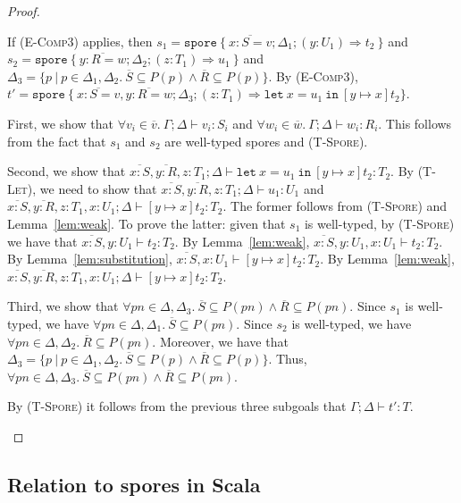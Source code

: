 \documentclass[a4paper,twoside]{article}
\newcommand{\seq}[1]{\overline{#1}}
\begin{document}
\begin{proof}
\begin{itemize}
If (\textsc{E-Comp3}) applies, then $s_1 = \texttt{spore}~\{~\seq{x:S=v}; \Delta_1; (y: U_1) \Rightarrow t_2~\}$ and $s_2 = \texttt{spore}~\{~\seq{y:R=w}; \Delta_2; (z: T_1) \Rightarrow u_1~\}$ and $\Delta_3 = \{ p~|~p \in \Delta_1,\Delta_2.~\seq{S} \subseteq P(p) \land \seq{R} \subseteq P(p)\}$. By (\textsc{E-Comp3}), \\ $t' = \texttt{spore}~\{~\seq{x:S=v}, \seq{y:R=w} ; \Delta_3 ; (z: T_1) \Rightarrow \texttt{let}~x = u_1~\texttt{in}~[y \mapsto x]t_2\}$.

First, we show that $\forall v_i \in \seq{v}.~\Gamma ; \Delta \vdash v_i : S_i$ and $\forall w_i \in \seq{w}.~\Gamma ; \Delta \vdash w_i : R_i$. This follows from the fact that $s_1$ and $s_2$ are well-typed spores and (\textsc{T-Spore}).

Second, we show that $\seq{x:S}, \seq{y:R}, z:T_1 ; \Delta \vdash \texttt{let}~x = u_1~\texttt{in}~[y \mapsto x]t_2 : T_2$. By (\textsc{T-Let}), we need to show that $\seq{x:S}, \seq{y:R}, z:T_1 ; \Delta \vdash u_1 : U_1$ and $\seq{x:S}, \seq{y:R}, z:T_1, x:U_1 ; \Delta \vdash [y \mapsto x]t_2 : T_2$. The former follows from (\textsc{T-Spore}) and Lemma~\ref{lem:weak}. To prove the latter: given that $s_1$ is well-typed, by (\textsc{T-Spore}) we have that $\seq{x:S}, y:U_1 \vdash t_2 : T_2$. By Lemma~\ref{lem:weak}, $\seq{x:S}, y:U_1, x:U_1 \vdash t_2 : T_2$. By Lemma~\ref{lem:substitution}, $\seq{x:S}, x:U_1 \vdash [y \mapsto x]t_2 : T_2$. By Lemma~\ref{lem:weak}, $\seq{x:S}, \seq{y:R}, z:T_1, x:U_1 ; \Delta \vdash [y \mapsto x]t_2 : T_2$.

Third, we show that $\forall pn \in \Delta, \Delta_3.~\seq{S} \subseteq P(pn) \land \seq{R} \subseteq P(pn)$. Since $s_1$ is well-typed, we have $\forall pn \in \Delta, \Delta_1.~\seq{S} \subseteq P(pn)$. Since $s_2$ is well-typed, we have $\forall pn \in \Delta, \Delta_2.~\seq{R} \subseteq P(pn)$. Moreover, we have that $\Delta_3 = \{ p~|~p \in \Delta_1,\Delta_2.~\seq{S} \subseteq P(p) \land \seq{R} \subseteq P(p)\}$. Thus, $\forall pn \in \Delta, \Delta_3.~\seq{S} \subseteq P(pn) \land \seq{R} \subseteq P(pn)$.

By (\textsc{T-Spore}) it follows from the previous three subgoals that $\Gamma ; \Delta \vdash t' : T$.

\end{itemize}
\end{proof}


\subsection{Relation to spores in Scala}
\end{document}
